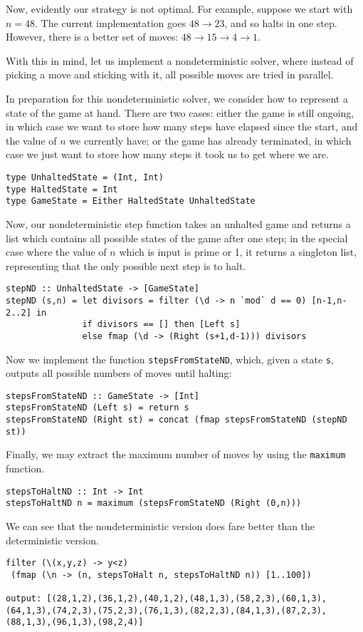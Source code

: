 \documentclass[11pt]{article}
\theoremstyle{nonumberplain}
\newcommand*\lsin{\lstinline}
\begin{document}
Now, evidently our strategy is not optimal. For example, suppose we start with $n = 48$. The current implementation goes $48 \to 23$, and so halts in one step. However, there is a better set of moves: $48 \to 15 \to 4 \to 1$.

With this in mind, let us implement a nondeterministic solver, where instead of picking a move and sticking with it, all possible moves are tried in parallel.

In preparation for this nondeterministic solver, we consider how to represent a state of the game at hand. There are two cases: either the game is still ongoing, in which case we want to store how many steps have elapsed since the start, and the value of $n$ we currently have; or the game has already terminated, in which case we just want to store how many steps it took us to get where we are.
\begin{lstlisting}
type UnhaltedState = (Int, Int)
type HaltedState = Int
type GameState = Either HaltedState UnhaltedState
\end{lstlisting}

Now, our nondeterministic step function takes an unhalted game and returns a list which contains all possible states of the game after one step; in the special case where the value of $n$ which is input is prime or 1, it returns a singleton list, representing that the only possible next step is to halt.
\begin{lstlisting}
stepND :: UnhaltedState -> [GameState]
stepND (s,n) = let divisors = filter (\d -> n `mod` d == 0) [n-1,n-2..2] in
               if divisors == [] then [Left s]
               else fmap (\d -> (Right (s+1,d-1))) divisors
\end{lstlisting}

Now we implement the function \lsin|stepsFromStateND|, which, given a state \lsin|s|, outputs all possible numbers of moves until halting:
\begin{lstlisting}
stepsFromStateND :: GameState -> [Int]
stepsFromStateND (Left s) = return s
stepsFromStateND (Right st) = concat (fmap stepsFromStateND (stepND st))
\end{lstlisting}

Finally, we may extract the maximum number of moves by using the \lsin|maximum| function.
\begin{lstlisting}
stepsToHaltND :: Int -> Int
stepsToHaltND n = maximum (stepsFromStateND (Right (0,n)))
\end{lstlisting}

We can see that the nondeterministic version does fare better than the deterministic version.
\begin{lstlisting}
filter (\(x,y,z) -> y<z)
 (fmap (\n -> (n, stepsToHalt n, stepsToHaltND n)) [1..100])
 
output: [(28,1,2),(36,1,2),(40,1,2),(48,1,3),(58,2,3),(60,1,3),(64,1,3),(74,2,3),(75,2,3),(76,1,3),(82,2,3),(84,1,3),(87,2,3),(88,1,3),(96,1,3),(98,2,4)]
\end{lstlisting}
\end{document}
